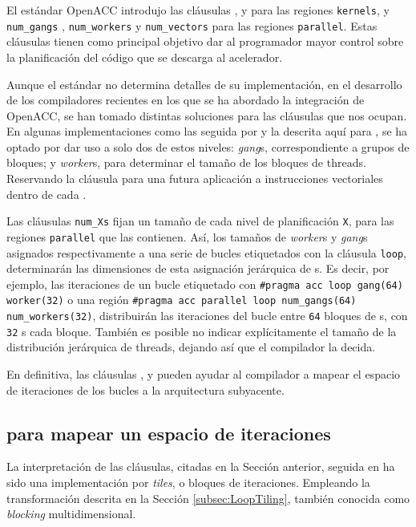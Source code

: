 El estándar \ac{OpenACC} \cite{URL::OpenACC} introdujo las 
cláusulas \gang{}, \worker{} y \cvector{} para las regiones \texttt{kernels}, y
\texttt{num\_gangs} , \texttt{num\_workers} y \texttt{num\_vectors} para las regiones \texttt{parallel}.
Estas cláusulas tienen como principal objetivo 
dar al programador mayor control sobre la planificación del código que 
se descarga al acelerador.

Aunque el estándar no determina detalles de su implementación,
en el desarrollo de los compiladores recientes en los que se ha abordado la integración de 
\ac{OpenACC}, se han tomado distintas soluciones para las cláusulas que nos ocupan. En 
algunas implementaciones como las seguida por \CAPS{} y la descrita aquí para 
\accULL{}, se ha optado por dar uso a solo dos de estos niveles: \textit{gang}s, 
correspondiente a grupos de bloques; y \textit{worker}s, para determinar el tamaño de 
los bloques de {thread}s. Reservando la cláusula \cvector{} para una futura aplicación
a instrucciones vectoriales \SIMD{} dentro de cada \thread{}.

Las cláusulas \texttt{num\_Xs} fijan un tamaño de cada nivel de planificación \texttt{X}, 
para las regiones \texttt{parallel} que las contienen. Así, los tamaños de 
\textit{worker}s y \textit{gang}s asignados respectivamente 
a una serie de bucles etiquetados con la cláusula \texttt{loop}, determinarán las 
dimensiones de esta asignación jerárquica de \thread{}s. Es decir, por ejemplo, las 
iteraciones de un bucle etiquetado con \texttt{\#pragma acc loop gang(64) worker(32)} o
una región \texttt{\#pragma acc parallel loop num\_gangs(64) num\_workers(32)},
distribuirán las iteraciones del bucle entre \texttt{64} bloques de \thread{}s, con 
\texttt{32} \thread{}s cada bloque.
También es posible no indicar explícitamente el tamaño de la distribución jerárquica de
threads, dejando así que el compilador la decida.

En definitiva, las cláusulas \gang{}, \worker{} y \cvector{} pueden ayudar al compilador a 
mapear el espacio de iteraciones de los bucles a la arquitectura subyacente.

\subsection{\tiling{} para mapear un espacio de iteraciones}
\label{subsec:tmaping}
La interpretación de las cláusulas, citadas en la Sección anterior, seguida en \accULL{} 
ha sido una implementación por \textit{tiles}, o bloques de iteraciones. 
Empleando la transformación \tiling{} descrita en la Sección \ref{subsec:LoopTiling},
también conocida como \textit{blocking} multidimensional.

